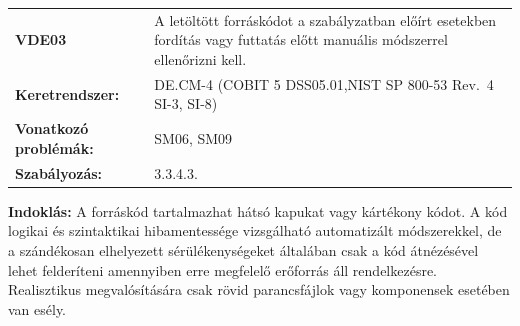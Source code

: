 \documentclass[12pt,magyar,a4paper,oneside]{scrreprt}
\begin{document}
\begin{longtable}[]{@{}ll@{}}
\toprule
\endhead
\begin{minipage}[t]{0.16\columnwidth}\raggedright
\textbf{VDE03}\strut
\end{minipage} & \begin{minipage}[t]{0.79\columnwidth}\raggedright
A letöltött forráskódot a szabályzatban előírt esetekben fordítás vagy
futtatás előtt manuális módszerrel ellenőrizni kell.\strut
\end{minipage}\tabularnewline
\begin{minipage}[t]{0.16\columnwidth}\raggedright
\textbf{Keretrendszer:}\strut
\end{minipage} & \begin{minipage}[t]{0.79\columnwidth}\raggedright
DE.CM-4 (COBIT 5 DSS05.01,NIST SP 800-53 Rev.~4 SI-3, SI-8)\strut
\end{minipage}\tabularnewline
\begin{minipage}[t]{0.16\columnwidth}\raggedright
\textbf{Vonatkozó problémák:}\strut
\end{minipage} & \begin{minipage}[t]{0.79\columnwidth}\raggedright
SM06, SM09\strut
\end{minipage}\tabularnewline
\begin{minipage}[t]{0.16\columnwidth}\raggedright
\textbf{Szabályozás:}\strut
\end{minipage} & \begin{minipage}[t]{0.79\columnwidth}\raggedright
3.3.4.3.\strut
\end{minipage}\tabularnewline
\bottomrule
\end{longtable}

\textbf{Indoklás: } A forráskód tartalmazhat hátsó kapukat vagy
kártékony kódot. A kód logikai és szintaktikai hibamentessége
vizsgálható automatizált módszerekkel, de a szándékosan elhelyezett
sérülékenységeket általában csak a kód átnézésével lehet felderíteni
amennyiben erre megfelelő erőforrás áll rendelkezésre. Realisztikus
megvalósítására csak rövid parancsfájlok vagy komponensek esetében van
esély.
\end{document}
